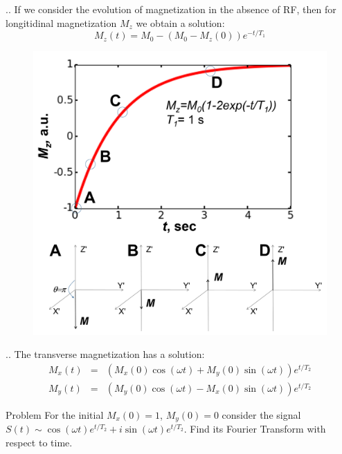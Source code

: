 \documentclass[handout]{beamer}
\begin{document}
\begin{frame}{\thesection.\thesubsection. \insertsubsection}
	If we consider the evolution of magnetization in the absence of RF, then for longitidinal magnetization $M_z$ we obtain a solution:
	\begin{equation}
		M_z(t) = M_0 - (M_0 - M_z(0)  ) e^{-t/T_1}		
	\end{equation}

\begin{figure}
	\centering
	\includegraphics[scale=0.2]{figures/T1buildup.png}
\end{figure}


\end{frame}



\begin{frame}{\thesection.\thesubsection. \insertsubsection}
	The transverse magnetization has a solution:
	\begin{equation} \label{eq: transverse magnetization}
	\begin{array}{lcl}
       M_x(t)&=& (M_x(0) \cos( \omega t)  + M_y(0) \sin( \omega t)) e^{t/T_2} \\     
       M_y(t)&=& (M_y(0) \cos( \omega t)  - M_x(0) \sin( \omega t)) e^{t/T_2} 
	\end{array}
	\end{equation}


\begin{block}{Problem}
	For the initial $M_x(0)=1$, $M_y(0)=0$ consider the signal $S(t) \sim  \cos( \omega t) e^{t/T_2}  + i \sin( \omega t) e^{t/T_2}  $. Find its Fourier Transform with respect to time.	
\end{block}

\end{frame}
\end{document}
